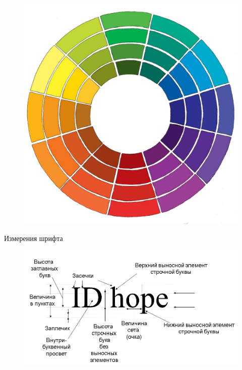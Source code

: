 \documentclass{beamer}
\begin{document}
\begin{frame}[t]
	\begin{figure}[h]
		\centering
		\includegraphics[scale=0.15]{images/color.jpg}
	\end{figure}
\end{frame}  

\begin{frame}[t]{Измерения шрифта}
	\begin{figure}[h]
		\centering
		\includegraphics[scale=0.5]{images/lec05-pic05.png}
	\end{figure}
\end{frame}  
\end{document}
